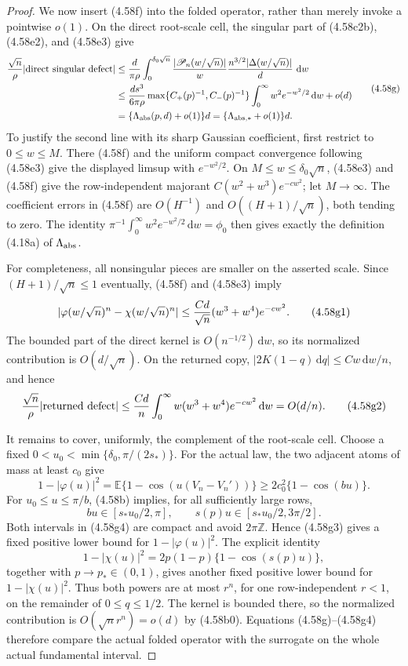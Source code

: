 \documentclass[11pt,a4paper]{article}
\numberwithin{equation}{section}
\theoremstyle{definition}
\theoremstyle{remark}
\newcommand{\E}{\mathbb E}
\newcommand{\dd}{\,\mathrm d}
\begin{document}
\begin{proof}
We now insert (4.58f) into the folded operator, rather than merely invoke
a pointwise \(o(1)\).  On the direct root-scale cell, the singular part
of (4.58c2b), (4.58e2), and (4.58e3) give
\[
 \begin{split}
 {\sqrt n\over\rho}|\hbox{direct singular defect}|
 &\le {d\over\pi\rho}\int_0^{\delta_0\sqrt n}
 {|\mathscr P_n(w/\sqrt n)|\over w}
       {n^{3/2}|\Delta(w/\sqrt n)|\over d}\,\dd w\\
 &\le {d s^3\over6\pi\rho}
       \max\{C_+(p)^{-1},C_-(p)^{-1}\}
       \int_0^\infty w^2e^{-w^2/2}\dd w+o(d)\\
 &=\{\Lambda_{\rm abs}(p,d)+o(1)\}d
  =\{\Lambda_{\rm abs,*}+o(1)\}d.
 \end{split}                                           \tag{4.58g}
\]
 To justify the second line with its sharp Gaussian coefficient, first
 restrict to \(0\le w\le M\).  There (4.58f) and the uniform compact
 convergence following (4.58e3) give the displayed limsup with
 \(e^{-w^2/2}\).  On \(M\le w\le\delta_0\sqrt n\), (4.58e3) and
 (4.58f) give the row-independent majorant
 \(C(w^2+w^3)e^{-cw^2}\); let \(M\to\infty\).  The coefficient errors
 in (4.58f) are \(O(H^{-1})\) and \(O((H+1)/\sqrt n)\), both tending to
 zero.  The
identity
\(\pi^{-1}\int_0^\infty w^2e^{-w^2/2}\dd w=\phi_0\)
then gives exactly the definition (4.18a) of \(\Lambda_{\rm abs}\).

For completeness, all nonsingular pieces are smaller on the asserted
scale.  Since \((H+1)/\sqrt n\le1\) eventually, (4.58f) and
(4.58e3) imply
\[
 |\varphi(w/\sqrt n)^n-\chi(w/\sqrt n)^n|
 \le {Cd\over\sqrt n}(w^3+w^4)e^{-cw^2}.             \tag{4.58g1}
\]
The bounded part of the direct kernel is \(O(n^{-1/2})\dd w\), so its
normalized contribution is \(O(d/\sqrt n)\).  On the returned copy,
\(|2K(1-q)\dd q|\le Cw\dd w/n\), and hence
\[
 {\sqrt n\over\rho}|\hbox{returned defect}|
 \le {Cd\over n}\int_0^\infty
       w(w^3+w^4)e^{-cw^2}\dd w=O(d/n).              \tag{4.58g2}
\]

It remains to cover, uniformly, the complement of the root-scale cell.
Choose a fixed
\(0<u_0<\min\{\delta_0,\pi/(2s_*)\}\).  For the actual law,
the two adjacent atoms of mass at least \(c_0\) give
\[
 1-|\varphi(u)|^2
 =\E\{1-\cos(u(V_n-V_n'))\}
 \ge2c_0^2\{1-\cos(bu)\}.                            \tag{4.58g3}
\]
For \(u_0\le u\le\pi/b\), (4.58b) implies, for all sufficiently large
rows,
\[
             bu\in[s_*u_0/2,\pi],\qquad
             s(p)u\in[s_*u_0/2,3\pi/2].              \tag{4.58g4}
\]
Both intervals in (4.58g4) are compact and avoid \(2\pi\mathbb Z\).
Hence (4.58g3) gives a fixed positive lower bound for
\(1-|\varphi(u)|^2\).  The explicit identity
\[
 1-|\chi(u)|^2=2p(1-p)\{1-\cos(s(p)u)\},
\]
together with \(p\to p_*\in(0,1)\), gives another fixed positive lower
bound for \(1-|\chi(u)|^2\).  Thus both powers are at most \(r^n\), for
one row-independent \(r<1\), on the remainder of
\(0\le q\le1/2\).  The kernel is bounded there, so the normalized
contribution is \(O(\sqrt n r^n)=o(d)\) by (4.58b0).  Equations
(4.58g)--(4.58g4) therefore compare the actual folded operator with the
surrogate on the whole actual fundamental interval.


\end{proof}
\end{document}
